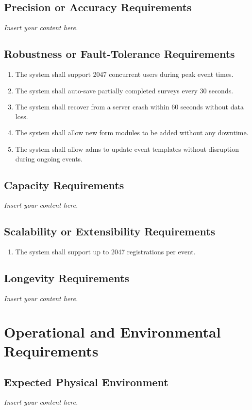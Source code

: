 \documentclass[12pt]{article}
\newcommand{\lips}{\textit{Insert your content here.}}
\begin{document}
\subsection{Precision or Accuracy Requirements}
\lips
\subsection{Robustness or Fault-Tolerance Requirements}
\begin{enumerate}[align=left,
  leftmargin=*,
  labelsep=1em,
  itemindent=0em,
  label=\bfseries RF-\arabic*:]
  \item The system shall support 2047 concurrent users during peak event times.
  \item The system shall auto-save partially completed surveys every 30 seconds.
  \item The system shall recover from a server crash within 60 seconds without data loss.
  \item The system shall allow new form modules to be added without any downtime.
  \item The system shall allow \glspl{adm} to update event templates without disruption
    during ongoing events.
\end{enumerate}
\subsection{Capacity Requirements}
\lips
\subsection{Scalability or Extensibility Requirements}
\begin{enumerate}[align=left,
  leftmargin=*,
  labelsep=1em,
  itemindent=0em,
  label=\bfseries SE-\arabic*:]
  \item The system shall support up to 2047 registrations per event.
\end{enumerate}
\subsection{Longevity Requirements}
\lips

\section{Operational and Environmental Requirements}
\subsection{Expected Physical Environment}
\lips
\end{document}

